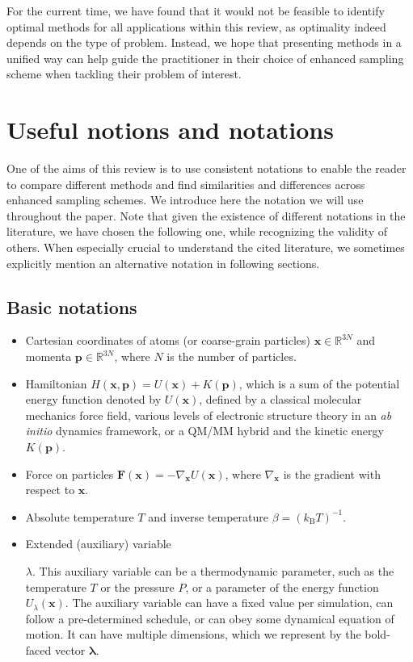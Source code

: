 \documentclass[9pt,review]{livecoms}
\newcommand{\vx}{\mathbf{x}}
\newcommand{\vp}{\mathbf{p}}
\newcommand{\vF}{\mathbf{F}}
\begin{document}
For the current time, we have found that it would not be feasible to identify optimal methods for all applications within this review, as optimality indeed depends on the type of problem. Instead, we hope that presenting methods in a unified way can help guide the practitioner in their choice of enhanced sampling scheme when tackling their problem of interest.




\section{Useful notions and notations}
\label{sec:Notion_Notation}

One of the aims of this review is to use consistent notations to enable the reader to compare different methods and find similarities and differences across enhanced sampling
schemes. We introduce here the notation we will use throughout the paper. Note that given the existence of different notations in the literature, we have chosen the following one, while recognizing the validity of others. When especially crucial to understand the cited literature, we sometimes explicitly mention an alternative notation in following sections.

\subsection{Basic notations}
\label{sec:Notation}
\begin{itemize}
\item Cartesian coordinates of atoms (or coarse-grain particles) $\vx \in \mathbb{R}^{3N}$ and momenta $\vp \in \mathbb{R}^{3N}$, where $N$ is the number of particles.
\item Hamiltonian $H(\vx,\vp)=U(\vx)+K(\vp)$, which is a sum of the potential energy function denoted by $U(\vx)$, defined by a classical molecular mechanics force field, various levels of electronic structure theory in an \emph{ab initio} dynamics framework, or a QM/MM hybrid and the kinetic energy $K(\vp)$.
\item Force on particles $\vF(\vx) = -\nabla_\vx U(\vx)$, where $\nabla_\vx$ is the gradient with respect to $\vx$.
\item Absolute temperature $T$ and inverse temperature $\beta = (k_\mathrm{B} T)^{-1}$.
\item \hypertarget{ref:AuxVar} {Extended (auxiliary) variable} $\lambda$. This auxiliary variable can be a thermodynamic parameter, such as the temperature $T$ or the pressure $P$, or a parameter of the energy function $U_\lambda(\vx)$. The auxiliary variable can have a fixed value per simulation, can follow a pre-determined schedule, or can obey some dynamical equation of motion. It can have multiple dimensions, which we represent by the bold-faced vector $\boldsymbol{\lambda}$.

\end{itemize}
\end{document}
